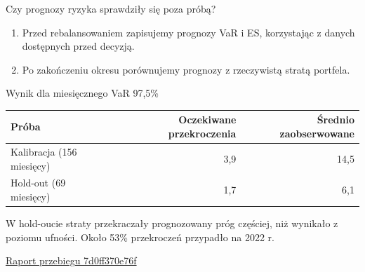 \documentclass[aspectratio=169,11pt]{beamer}
\newcommand{\source}[2]{\vfill{\scriptsize\href{#1}{#2}}}
\begin{document}
\begin{frame}{Czy prognozy ryzyka sprawdziły się poza próbą?}

\begin{enumerate}
  \item Przed rebalansowaniem zapisujemy prognozy VaR i ES,
        korzystając z danych dostępnych przed decyzją.
  \item Po zakończeniu okresu porównujemy prognozy
        z rzeczywistą stratą portfela.
\end{enumerate}

\begin{block}{Wynik dla miesięcznego VaR 97,5\%}
\centering
\begin{tabular}{lrr}
\toprule
Próba & Oczekiwane przekroczenia & Średnio zaobserwowane \\
\midrule
Kalibracja (156 miesięcy) & 3,9 & 14,5 \\
Hold-out (69 miesięcy)   & 1,7 & 6,1 \\
\bottomrule
\end{tabular}
\end{block}

W hold-oucie straty przekraczały prognozowany próg częściej,
niż wynikało z poziomu ufności. Około 53\% przekroczeń
przypadło na 2022 r.

\source{https://github.com/michalmarchwiak/bsc-project/blob/main/artifacts/reports/backtest_summary.md}
       {Raport przebiegu 7d0ff370e76f}
\end{frame}
\end{document}
